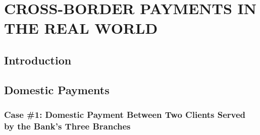 \newpage

\section{\MakeUppercase{Cross-Border Payments in the Real World}}\label{sec:payments}


\subsection{Introduction}

\subsection{Domestic Payments}

\subsubsection*{Case \#1: Domestic Payment Between Two Clients Served by the Bank's Three Branches}

